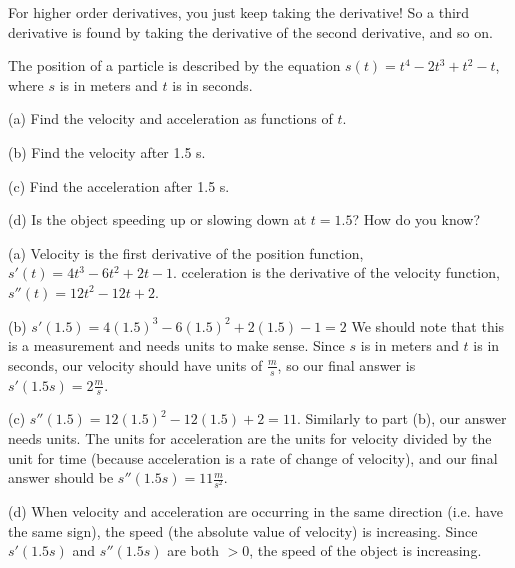 For higher order derivatives, you just keep taking the derivative! So a third derivative is found by taking the derivative of the second derivative, and so on. 
\begin{Exercise}[title=Using Derivatives to Describe Motion, label=diffpoly2]
The position of a particle is described by the equation $s(t) = t^4-2t^3+t^2-t$, where $s$ is in meters and $t$ is in seconds. 

(a) Find the velocity and acceleration as functions of $t$.

(b) Find the velocity after 1.5 s. 

(c) Find the acceleration after 1.5 s.

(d) Is the object speeding up or slowing down at $t=1.5$? How do you know? 

\end{Exercise}
\begin{Answer}[ref=diffpoly2]
(a) Velocity is the first derivative of the position function, $s'(t) = 4t^3-6t^2+2t-1$. cceleration is the derivative of the velocity function, $s''(t) = 12t^2-12t+2$. 

(b) $s'(1.5) = 4(1.5)^3-6(1.5)^2+2(1.5)-1 = 2$ We should note that this is a measurement and needs units to make sense. Since $s$ is in meters and $t$ is in seconds, our velocity should have units of $\frac{m}{s}$, so our final answer is $s'(1.5s) = 2\frac{m}{s}$. 

(c) $s''(1.5) = 12(1.5)^2-12(1.5)+2 = 11$. Similarly to part (b), our answer needs units. The units for acceleration are the units for velocity divided by the unit for time (because acceleration is a rate of change of velocity), and our final answer should be $s''(1.5s) = 11\frac{m}{s^2}$.

(d) When velocity and acceleration are occurring in the same direction (i.e. have the same sign), the speed (the absolute value of velocity) is increasing. Since $s'(1.5s)$ and $s''(1.5s)$ are both $>0$, the speed of the object is increasing. 
\end{Answer}